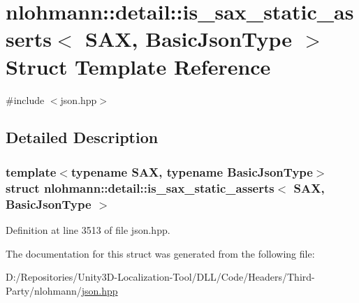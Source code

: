 \hypertarget{structnlohmann_1_1detail_1_1is__sax__static__asserts}{}\section{nlohmann\+::detail\+::is\+\_\+sax\+\_\+static\+\_\+asserts$<$ S\+AX, Basic\+Json\+Type $>$ Struct Template Reference}
\label{structnlohmann_1_1detail_1_1is__sax__static__asserts}


{\ttfamily \#include $<$json.\+hpp$>$}



\subsection{Detailed Description}
\subsubsection*{template$<$typename S\+AX, typename Basic\+Json\+Type$>$\newline
struct nlohmann\+::detail\+::is\+\_\+sax\+\_\+static\+\_\+asserts$<$ S\+A\+X, Basic\+Json\+Type $>$}



Definition at line 3513 of file json.\+hpp.



The documentation for this struct was generated from the following file\+:\begin{DoxyCompactItemize}
\item 
D\+:/\+Repositories/\+Unity3\+D-\/\+Localization-\/\+Tool/\+D\+L\+L/\+Code/\+Headers/\+Third-\/\+Party/nlohmann/\mbox{\hyperlink{json_8hpp}{json.\+hpp}}\end{DoxyCompactItemize}
